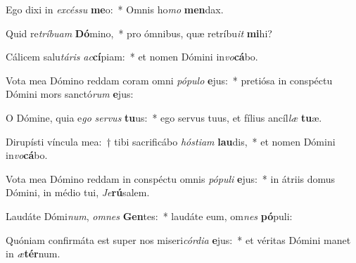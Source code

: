 \item Ego dixi in \textit{ex}\textit{cés}\textit{su} \textbf{me}o:~* Omnis ho\textit{mo} \textbf{men}dax.
\item Quid re\textit{trí}\textit{bu}\textit{am} \textbf{Dó}mino,~* pro ómnibus, quæ retríbu\textit{it} \textbf{mi}hi?
\item Cálicem salu\textit{tá}\textit{ris} \textit{ac}\textbf{cí}piam:~* et nomen Dómini in\textit{vo}\textbf{cá}bo.
\item Vota mea Dómino reddam coram omni \textit{pó}\textit{pu}\textit{lo} \textbf{e}jus:~* pretiósa in conspéctu Dómini mors sanctó\textit{rum} \textbf{e}jus:
\item O Dómine, quia e\textit{go} \textit{ser}\textit{vus} \textbf{tu}us:~* ego servus tuus, et fílius ancíl\textit{læ} \textbf{tu}æ.
\item Dirupísti víncula mea:~† tibi sacrificábo \textit{hós}\textit{ti}\textit{am} \textbf{lau}dis,~* et nomen Dómini in\textit{vo}\textbf{cá}bo.
\item Vota mea Dómino reddam in conspéctu omnis \textit{pó}\textit{pu}\textit{li} \textbf{e}jus:~* in átriis domus Dómini, in médio tui, \textit{Je}\textbf{rú}salem.
\item Laudáte Dómi\textit{num}, \textit{om}\textit{nes} \textbf{Gen}tes:~* laudáte eum, om\textit{nes} \textbf{pó}puli:
\item Quóniam confirmáta est super nos miseri\textit{cór}\textit{di}\textit{a} \textbf{e}jus:~* et véritas Dómini manet in \textit{æ}\textbf{tér}num.
